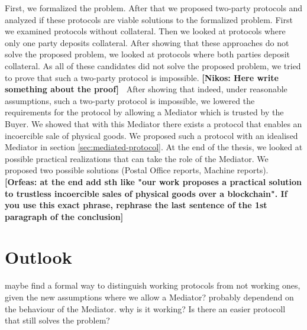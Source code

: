 \documentclass{cacthesis}
\newcommand{\authnote}[3]{{ \footnotesize \textbf{#1[#2: #3]~}}}
\newcommand{\orfnote}[1]{\authnote{\color{blue}}{Orfeas}{#1}}
\newcommand{\niknote}[1]{\authnote{\color{red}}{Nikos}{#1}}
\begin{document}
 First, we formalized the problem. After that we proposed two-party protocols and analyzed if these protocols are viable solutions to the formalized problem. First we examined protocols without collateral. Then we looked at protocols where only one party deposits collateral. After showing that these approaches do not solve the proposed problem, we looked at protocols where both parties deposit collateral. As all of these candidates did not solve the proposed problem, we tried to prove that such a two-party protocol is impossible. \niknote{Here write something about the proof} After showing that indeed, under reasonable assumptions, such a two-party protocol is impossible, we lowered the requirements for the protocol by allowing a Mediator which is trusted by the Buyer. We showed that with this Mediator there exists a protocol that enables an incoercible sale of physical goods. We proposed such a protocol with an idealised Mediator in section \ref{sec:mediated-protocol}. At the end of the thesis, we looked at possible practical realizations that can take the role of the Mediator. We proposed two possible solutions (Postal Office reports, Machine reports). \orfnote{ at the end add sth like "our work proposes a practical solution to trustless incoercible sales of physical goods over a blockchain". If you use this exact phrase, rephrase the last sentence of the 1st paragraph of the conclusion}



\section{Outlook}
maybe find a formal way to distinguish working protocols from not working ones, given the new assumptions where we allow a Mediator? probably dependend on the behaviour of the Mediator. why is it working? Is there an easier protocoll that still solves the problem?\newline
\end{document}
